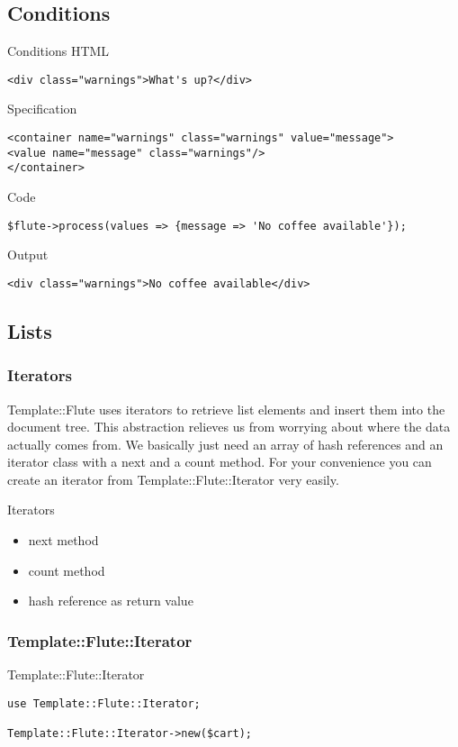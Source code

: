 \subsection{Conditions}
\begin{frame}[fragile]{Conditions}
HTML
\begin{lstlisting}
<div class="warnings">What's up?</div>
\end{lstlisting}
Specification
\begin{lstlisting}
<container name="warnings" class="warnings" value="message">
<value name="message" class="warnings"/>
</container>
\end{lstlisting}
Code
\begin{lstlisting}
$flute->process(values => {message => 'No coffee available'});
\end{lstlisting}
Output
\begin{lstlisting}
<div class="warnings">No coffee available</div>
\end{lstlisting}
\end{frame}

\subsection{Lists}

\subsubsection{Iterators}
Template::Flute uses iterators to retrieve list elements and insert them into
the document tree. This abstraction relieves us from worrying about where
the data actually comes from. We basically just need an array of hash
references and an iterator class with a next and a count method. For your
convenience you can create an iterator from Template::Flute::Iterator
very easily.

\begin{frame}{Iterators}
\begin{itemize}
  \item next method
  \item count method
  \item hash reference as return value
 \end{itemize}
\end{frame}

\subsubsection{Template::Flute::Iterator}
\begin{frame}[fragile]{Template::Flute::Iterator}
\begin{lstlisting}
use Template::Flute::Iterator;

Template::Flute::Iterator->new($cart);
\end{lstlisting}
\end{frame}

